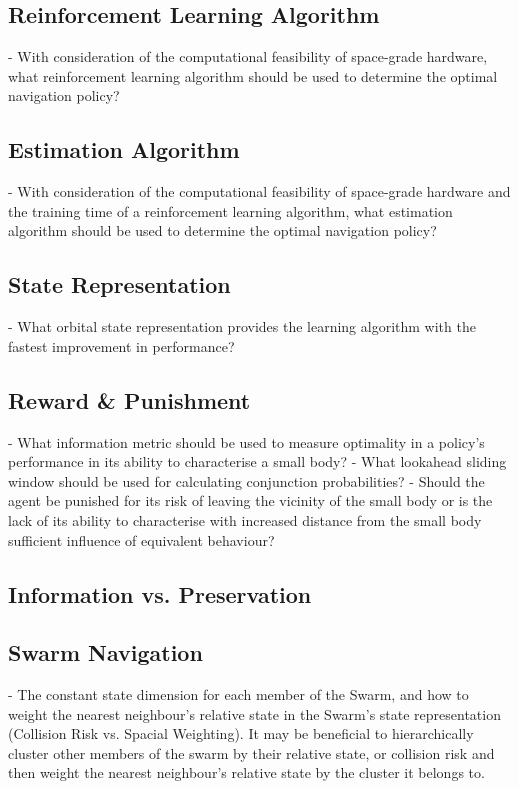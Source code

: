 \subsection{Reinforcement Learning Algorithm}

- With consideration of the computational feasibility of space-grade hardware, what reinforcement learning algorithm should be used to determine the optimal navigation policy?

\subsection{Estimation Algorithm}

- With consideration of the computational feasibility of space-grade hardware and the training time of a reinforcement learning algorithm, what estimation algorithm should be used to determine the optimal navigation policy?

\subsection{State Representation}

- What orbital state representation provides the learning algorithm with the fastest improvement in performance?

\subsection{Reward \& Punishment}

- What information metric should be used to measure optimality in a policy's performance in its ability to characterise a small body?
- What lookahead sliding window should be used for calculating conjunction probabilities?
- Should the agent be punished for its risk of leaving the vicinity of the small body or is the lack of its ability to characterise with increased distance from the small body sufficient influence of equivalent behaviour?

\subsection{Information vs. Preservation}

\subsection{Swarm Navigation}

- The constant state dimension for each member of the Swarm, and how to weight the nearest neighbour's relative state in the Swarm's state representation (Collision Risk vs. Spacial Weighting). It may be beneficial to hierarchically cluster other members of the swarm by their relative state, or collision risk and then weight the nearest neighbour's relative state by the cluster it belongs to.

